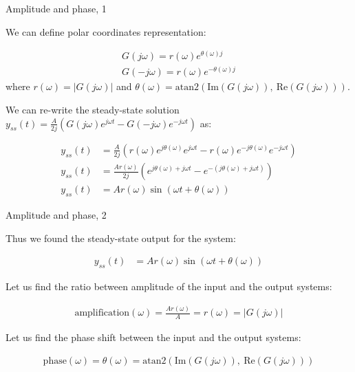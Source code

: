 \documentclass{beamer}
\begin{document}
\begin{frame}{Amplitude and phase, 1}
	\begin{flushleft}
		
		We can define polar coordinates representation:
		
		\begin{align}
			G(j\omega) = r(\omega) e^{\theta(\omega) j} 
			\\
			G(-j\omega) = r(\omega) e^{-\theta(\omega) j}
		\end{align}
		where $r(\omega) = |G(j\omega)|$ and 
		$\theta(\omega) = \text{atan2}( \text{Im}(G(j\omega)), \ \text{Re}(G(j\omega))  )$.
		
		\bigskip
		
		We can re-write the steady-state solution $y_{ss}(t) = 
		\frac{A}{2j}
		\left(
		G(j\omega)e^{ j\omega t} - G(-j\omega) e^{- j\omega t}
		\right)$ as:
		
		\begin{align}
			y_{ss}(t) &= 
			\frac{A}{2j}
			\left(
			r(\omega) e^{j \theta(\omega) }e^{ j\omega t} - r(\omega) e^{-j\theta(\omega) } e^{- j\omega t}
			\right)
			\\
			y_{ss}(t) &= 
			\frac{A r(\omega)}{2j}
			\left(
			 e^{j \theta(\omega) + j\omega t} - e^{-(j \theta(\omega) + j\omega t)}
			\right)
			\\
			y_{ss}(t) &= 
			A r(\omega) \sin (\omega t + \theta(\omega))
		\end{align}
		
		
	\end{flushleft}
\end{frame}




\begin{frame}{Amplitude and phase, 2}
	\begin{flushleft}
		
		Thus we found the steady-state output for the system:
		
		\begin{align}
			y_{ss}(t) &= 
			A r(\omega) \sin (\omega t + \theta(\omega))
		\end{align}
		
		Let us find the ratio between amplitude of the input and the output systems:
		
		\begin{align}
			\text{amplification}(\omega)
			=
			\frac{A r(\omega)}{A} = r(\omega) = |G(j\omega)|
		\end{align}
		
		Let us find the phase shift between the input and the output systems:
		
		\begin{align}
			\text{phase}(\omega)
			=
			\theta(\omega) 
			=
			\text{atan2}( \text{Im}(G(j\omega)), \ \text{Re}(G(j\omega))  )
		\end{align}
		
	\end{flushleft}
\end{frame}
\end{document}
